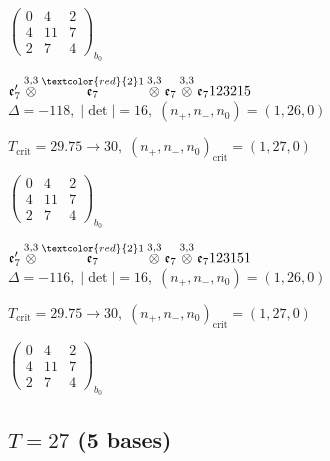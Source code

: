 \documentclass[10pt]{article}
\begin{document}
\hspace{2em}$\left(\begin{smallmatrix}0 & 4 & 2 \\ 4 & 11 & 7 \\ 2 & 7 & 4\end{smallmatrix}\right)_{\!b_0}$

\smallskip

$\mathfrak{e}_7'\overset{3,3}{\otimes}\overset{\textcolor{red}{2}1}{\mathfrak{e}_7}\overset{3,3}{\otimes}\mathfrak{e}_7\overset{3,3}{\otimes}\mathfrak{e}_7123215$ \quad $\Delta=-118,\; |\det|=16,\; (n_+,n_-,n_0)=(1,26,0)$

\hspace{1em}$T_{\text{crit}}=29.75 \to 30,\; (n_+,n_-,n_0)_{\text{crit}}=(1,27,0)$

\hspace{2em}$\left(\begin{smallmatrix}0 & 4 & 2 \\ 4 & 11 & 7 \\ 2 & 7 & 4\end{smallmatrix}\right)_{\!b_0}$

\smallskip

$\mathfrak{e}_7'\overset{3,3}{\otimes}\overset{\textcolor{red}{2}1}{\mathfrak{e}_7}\overset{3,3}{\otimes}\mathfrak{e}_7\overset{3,3}{\otimes}\mathfrak{e}_7123151$ \quad $\Delta=-116,\; |\det|=16,\; (n_+,n_-,n_0)=(1,26,0)$

\hspace{1em}$T_{\text{crit}}=29.75 \to 30,\; (n_+,n_-,n_0)_{\text{crit}}=(1,27,0)$

\hspace{2em}$\left(\begin{smallmatrix}0 & 4 & 2 \\ 4 & 11 & 7 \\ 2 & 7 & 4\end{smallmatrix}\right)_{\!b_0}$


\subsection*{$T = 27$ \quad (5 bases)}
\smallskip
\end{document}
